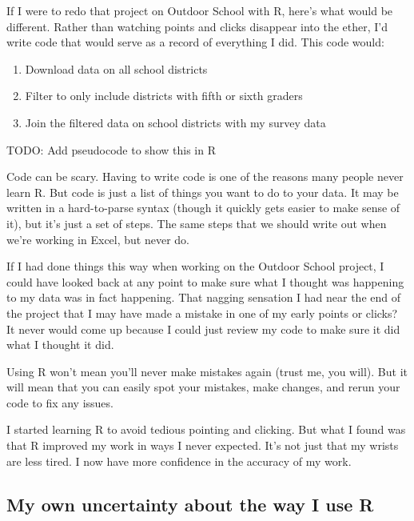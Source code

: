 \documentclass[
]{book}
\providecommand{\tightlist}{%
  \setlength{\itemsep}{0pt}\setlength{\parskip}{0pt}}
\begin{document}
If I were to redo that project on Outdoor School with R, here's what would be different. Rather than watching points and clicks disappear into the ether, I'd write code that would serve as a record of everything I did. This code would:

\begin{enumerate}
\def\labelenumi{\arabic{enumi}.}
\tightlist
\item
  Download data on all school districts
\item
  Filter to only include districts with fifth or sixth graders
\item
  Join the filtered data on school districts with my survey data
\end{enumerate}

TODO: Add pseudocode to show this in R

Code can be scary. Having to write code is one of the reasons many people never learn R. But code is just a list of things you want to do to your data. It may be written in a hard-to-parse syntax (though it quickly gets easier to make sense of it), but it's just a set of steps. The same steps that we should write out when we're working in Excel, but never do.

If I had done things this way when working on the Outdoor School project, I could have looked back at any point to make sure what I thought was happening to my data was in fact happening. That nagging sensation I had near the end of the project that I may have made a mistake in one of my early points or clicks? It never would come up because I could just review my code to make sure it did what I thought it did.

Using R won't mean you'll never make mistakes again (trust me, you will). But it will mean that you can easily spot your mistakes, make changes, and rerun your code to fix any issues.

I started learning R to avoid tedious pointing and clicking. But what I found was that R improved my work in ways I never expected. It's not just that my wrists are less tired. I now have more confidence in the accuracy of my work.

\hypertarget{my-own-uncertainty-about-the-way-i-use-r}{%
\subsection*{My own uncertainty about the way I use R}\label{my-own-uncertainty-about-the-way-i-use-r}}
\end{document}
